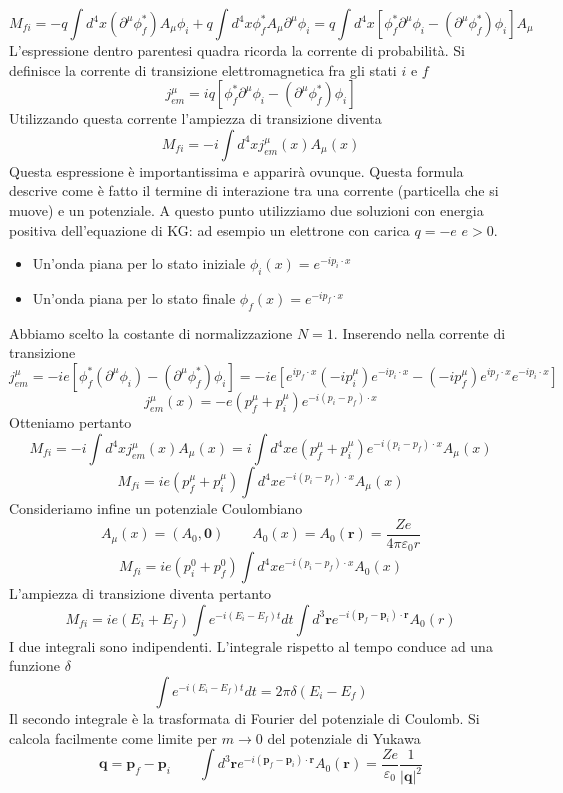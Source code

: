 $$
M_{fi} = -q \int d^4x (\partial^\mu \phi_f^*) A_\mu \phi_i + q \int d^4x \phi_f^* A_\mu \partial^\mu \phi_i = q \int d^4x [\phi_f^* \partial^\mu \phi_i - (\partial^\mu \phi_f^*) \phi_i] A_\mu
$$
L'espressione dentro parentesi quadra ricorda la corrente di probabilità. Si definisce la corrente di transizione elettromagnetica fra gli stati $i$ e $f$
$$
j_{em}^\mu = iq [\phi_f^* \partial^\mu \phi_i - (\partial^\mu \phi_f^*) \phi_i]
$$
Utilizzando questa corrente l'ampiezza di transizione diventa
$$
M_{fi} = -i \int d^4x j_{em}^\mu(x) A_\mu(x)
$$
Questa espressione è importantissima e apparirà ovunque. Questa formula descrive come è fatto il termine di interazione tra una corrente (particella che si muove) e un potenziale. A questo punto utilizziamo due soluzioni con energia positiva dell'equazione di KG: ad esempio un elettrone con carica $q=-e$ $e>0$.
\begin{itemize}
    \item Un'onda piana per lo stato iniziale $\phi_i(x)=e^{-ip_i\cdot x}$
    \item Un'onda piana per lo stato finale $\phi_f(x)=e^{-ip_f\cdot x}$
\end{itemize}
Abbiamo scelto la costante di normalizzazione $N=1$. Inserendo nella corrente di transizione
$$
j_{em}^\mu = -ie[\phi_f^*(\partial^\mu \phi_i) - (\partial^\mu \phi_f^*)\phi_i] = -ie[e^{ip_f \cdot x}(-ip_i^\mu)e^{-ip_i \cdot x} - (-ip_f^\mu)e^{ip_f \cdot x}e^{-ip_i \cdot x}]
$$
$$
j_{em}^\mu(x) = -e(p_f^\mu + p_i^\mu)e^{-i(p_i - p_f) \cdot x}
$$
Otteniamo pertanto
$$
M_{fi} = -i \int d^4x j_{em}^\mu(x) A_\mu(x) = i \int d^4x e(p_f^\mu + p_i^\mu) e^{-i(p_i - p_f) \cdot x} A_\mu(x)
$$
$$
M_{fi} = ie(p_f^\mu + p_i^\mu) \int d^4x e^{-i(p_i - p_f) \cdot x} A_\mu(x)
$$
Consideriamo infine un potenziale Coulombiano
$$
A_\mu(x) = (A_0, \mathbf{0}) \qquad A_0(x) = A_0(\mathbf{r}) = \frac{Ze}{4\pi\varepsilon_0 r}
$$
$$
M_{fi} = ie(p_i^0 + p_f^0) \int d^4x e^{-i(p_i - p_f) \cdot x} A_0(x)
$$
L'ampiezza di transizione diventa pertanto
$$
M_{fi} = ie(E_i + E_f) \int e^{-i(E_i - E_f)t} dt \int d^3\mathbf{r} e^{-i(\mathbf{p}_f - \mathbf{p}_i) \cdot \mathbf{r}} A_0(r)
$$
I due integrali sono indipendenti. L'integrale rispetto al tempo conduce ad una funzione $\delta$
$$
\int e^{-i(E_i - E_f)t} dt = 2\pi\delta(E_i - E_f)
$$
Il secondo integrale è la trasformata di Fourier del potenziale di Coulomb. Si calcola facilmente come limite per $m\to0$ del potenziale di Yukawa
$$
\mathbf{q} = \mathbf{p}_f - \mathbf{p}_i \qquad \int d^3\mathbf{r} e^{-i(\mathbf{p}_f - \mathbf{p}_i) \cdot \mathbf{r}} A_0(\mathbf{r}) = \frac{Ze}{\varepsilon_0} \frac{1}{|\mathbf{q}|^2}
$$
